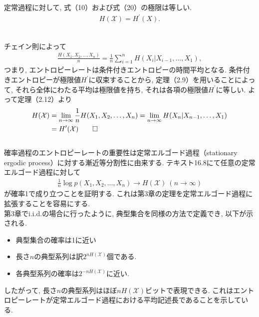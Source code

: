 \documentclass[a4j]{jsarticle}
\begin{document}
\begin{itembox}[l]{}
	定常過程に対して, 式（10）および式（20）の極限は等しい.
	\begin{align}
		H(\mathcal{X}) = H^\prime(X).
	\end{align}
\end{itembox}\\

 チェイン則によって
\begin{align}
	\frac{H(X_1, X_2, \ldots, X_n)}{n} = \frac{1}{n} \sum_{i=1}^{n} H(X_i | X_{i-1}, \ldots, X_1),
\end{align}
つまり, エントロピーレートは条件付きエントロピーの時間平均となる. 条件付きエントロピーが極限値$H^\prime$に収束することから, 定理（2.9）を用いることによって, それら全体にわたる平均は極限値を持ち, それは各項の極限値$H^\prime$に等しい. よって定理（2.12）より
\begin{align}
	H(\mathcal{X}) & = \lim_{n \rightarrow \infty} \frac{1}{n} H(X_1, X_2, \ldots, X_n) = \lim_{n \rightarrow \infty} H(X_n | X_{n-1}, \ldots, X_1) \\
	               & = H^\prime(\mathcal{X})\qed
\end{align}\\

 確率過程のエントロピーレートの重要性は定常エルゴード過程（stationary ergodic process）に対する漸近等分割性に由来する. テキスト\cite{text}16.8にて任意の定常エルゴード過程に対して
\begin{align}
	\frac{1}{n}\log p(X_1, X_2, \ldots, X_n) \rightarrow H(\mathcal{X}) \: (n \rightarrow \infty)
\end{align}
が確率1で成り立つことを証明する. これは第3章の定理を定常エルゴード過程に拡張することを容易にする.\\

第3章でi.i.d.の場合に行ったように, 典型集合を同様の方法で定義でき, 以下が示される.
\begin{itemize}
	\item 典型集合の確率は1に近い
	\item 長さ$n$の典型系列は訳$2^{nH(\mathcal{X})}$個である.
	\item 各典型系列の確率は$2^{-nH(\mathcal{X})}$に近い.
\end{itemize}
したがって, 長さ$n$の典型系列はほぼ$nH(\mathcal{X})$ビットで表現できる. これはエントロピーレートが定常エルゴード過程における平均記述長であることを示している.\\
\end{document}
